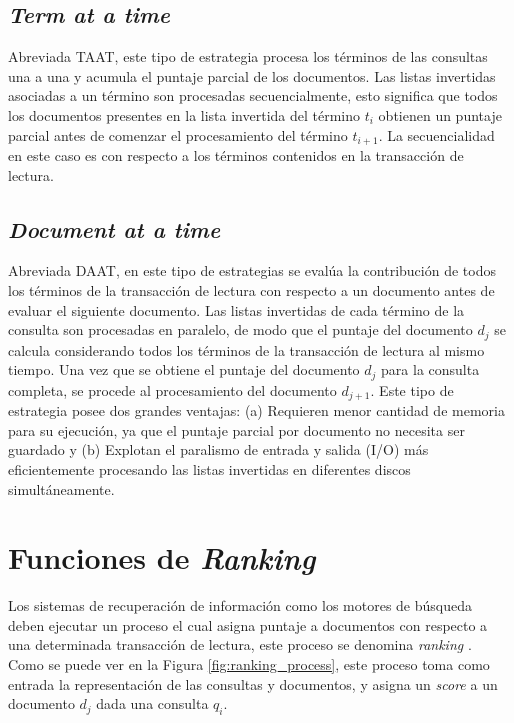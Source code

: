 \subsection{\textit{Term at a time}}
\label{marco:TAAT}
Abreviada TAAT, este tipo de estrategia procesa los términos de las consultas una a una y acumula el puntaje parcial de los documentos. Las listas invertidas asociadas a un término son procesadas secuencialmente, esto significa que todos los documentos presentes en la lista invertida del término $t_{i}$ obtienen un puntaje parcial antes de comenzar el procesamiento del término $t_{i+1}$. La secuencialidad en este caso es con respecto a los términos contenidos en la transacción de lectura.

\subsection{\textit{Document at a time}}
\label{marco:DAAT}
Abreviada DAAT, en este tipo de estrategias se evalúa la contribución de todos los términos de la transacción de lectura con respecto a un documento antes de evaluar el siguiente documento. Las listas invertidas de cada término de la consulta son procesadas en paralelo, de modo que el puntaje del documento $d_{j}$ se calcula considerando todos los términos de la transacción de lectura al mismo tiempo. Una vez que se obtiene el puntaje del documento $d_{j}$ para la consulta completa, se procede al procesamiento del documento $d_{j+1}$. Este tipo de estrategia posee dos grandes ventajas: (a) Requieren menor cantidad de memoria para su ejecución, ya que el puntaje parcial por documento no necesita ser guardado y (b) Explotan el paralismo de entrada y salida (I/O) más eficientemente procesando las listas invertidas en diferentes discos simultáneamente.

\section{Funciones de \textit{Ranking}}
\label{marco:ranking}
Los sistemas de recuperación de información como los motores de búsqueda deben ejecutar un proceso el cual asigna puntaje a documentos con respecto a una determinada transacción de lectura, este proceso se denomina \textit{ranking} \citep{Baeza-Yates:2011}. Como se puede ver en la Figura \ref{fig:ranking_process}, este proceso toma como entrada la representación de las consultas y documentos, y asigna un \textit{score} a un documento $d_{j}$ dada una consulta $q_{i}$.

